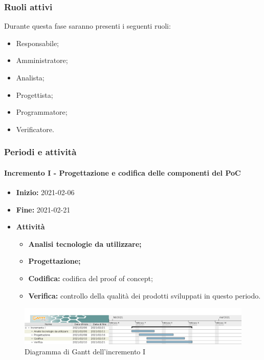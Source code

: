 \subsubsection{Ruoli attivi}
Durante questa fase saranno presenti i seguenti ruoli:
\begin{itemize}
    \item Responsabile;
    \item Amministratore;
    \item Analista;
    \item Progettista;
    \item Programmatore;
    \item Verificatore.
\end{itemize}

\subsubsection{Periodi e attività}

\paragraph[Incremento I]{Incremento I - \textnormal{Progettazione e codifica delle componenti del PoC}}
\begin{itemize}
    \item [] \textbf{Inizio:} 2021-02-06
    \item [] \textbf{Fine:} 2021-02-21
    \item [] \textbf{Attività}
          \begin{itemize}
              \item \textbf{Analisi tecnologie da utilizzare;}
              \item \textbf{Progettazione;}
              \item \textbf{Codifica:} codifica del proof of concept;
              \item \textbf{Verifica:} controllo della qualità dei prodotti sviluppati in questo periodo.
          \end{itemize}
\end{itemize}

\begin{figure}[H]
    \centering
    \includegraphics[width=1\linewidth]{res/images/pianificazione/incremento_1.png}
    \caption{Diagramma di Gantt dell'incremento I}
    \label{fig:_Gantt incremento I}
\end{figure}

